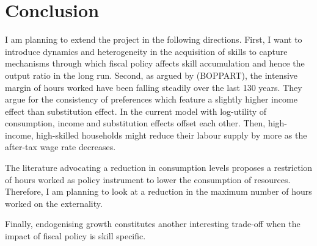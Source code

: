 \section{Conclusion}\label{sec:con}

I am planning to extend the project in the following directions.
First, I want to introduce dynamics and heterogeneity in the acquisition of skills to capture mechanisms through which fiscal policy affects skill accumulation and hence the output ratio in the long run. Second, as argued by (BOPPART), the intensive margin of hours worked have been falling steadily over the last 130 years. They argue for the consistency of preferences which feature a slightly higher income effect than substitution effect. In the current model with log-utility of consumption, income and substitution effects offset each other. Then, high-income, high-skilled households might reduce their labour supply by more as the after-tax wage rate decreases. 

The literature advocating a reduction in consumption levels proposes a restriction of hours worked as policy instrument to lower the consumption of resources. Therefore, I am planning to look at a reduction in the maximum number of hours worked on the externality. 

Finally, endogenising growth constitutes another interesting trade-off when the impact of fiscal policy is skill specific. 

